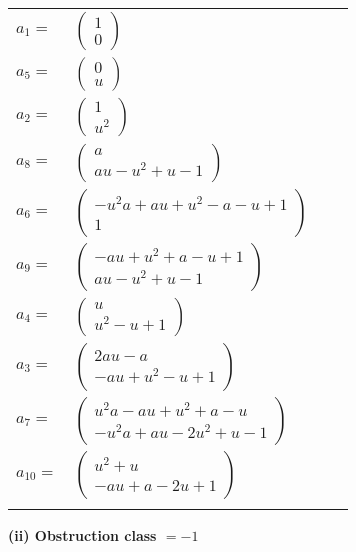 \documentclass[1p]{elsarticle_modified}
\theoremstyle{definition}
\begin{document}
\begin{tabular}{m{7pt} m{180pt} m{7pt} m{180pt} }
\flushright $a_{1}=$&$\begin{pmatrix}1\\0\end{pmatrix}$ \\
\flushright $a_{5}=$&$\begin{pmatrix}0\\u\end{pmatrix}$ \\
\flushright $a_{2}=$&$\begin{pmatrix}1\\u^2\end{pmatrix}$ \\
\flushright $a_{8}=$&$\begin{pmatrix}a\\a u- u^2+u-1\end{pmatrix}$ \\
\flushright $a_{6}=$&$\begin{pmatrix}- u^2 a+a u+u^2- a- u+1\\1\end{pmatrix}$ \\
\flushright $a_{9}=$&$\begin{pmatrix}- a u+u^2+a- u+1\\a u- u^2+u-1\end{pmatrix}$ \\
\flushright $a_{4}=$&$\begin{pmatrix}u\\u^2- u+1\end{pmatrix}$ \\
\flushright $a_{3}=$&$\begin{pmatrix}2 a u- a\\- a u+u^2- u+1\end{pmatrix}$ \\
\flushright $a_{7}=$&$\begin{pmatrix}u^2 a- a u+u^2+a- u\\- u^2 a+a u-2 u^2+u-1\end{pmatrix}$ \\
\flushright $a_{10}=$&$\begin{pmatrix}u^2+u\\- a u+a-2 u+1\end{pmatrix}$\\&\end{tabular}
\flushleft \textbf{(ii) Obstruction class $= -1$}\\~\\
\end{document}
